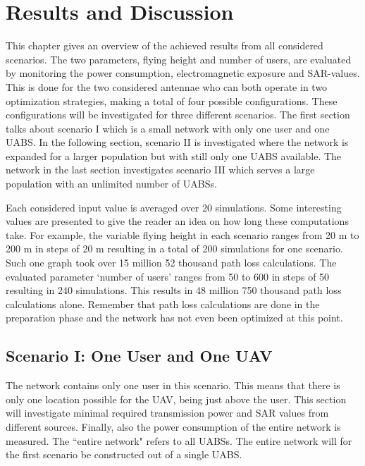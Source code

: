 \chapter{Results and Discussion}
\label{chap:results}

This chapter gives an overview of the achieved results from all considered scenarios. The two parameters,
flying height and number of users, are evaluated by monitoring the power consumption, electromagnetic exposure and \gls{SAR}-values.
This is done for the two considered antennae who can both operate in two optimization strategies, making a total of four possible configurations.
These configurations will be investigated for three different scenarios.
The first section talks about scenario I which is a small network with only one user and one \gls{UABS}. In 
the following section, scenario II is investigated where the network is expanded for a larger population 
but with still only one \gls{UABS} available.
The network in the last section investigates scenario III which serves a large population with an unlimited number of \gls{UABS}s.

Each considered input value is averaged over 20 simulations. 
Some interesting values are presented to give the reader an idea on how long these computations take.
For example, the variable flying height in each scenario ranges from 
20 m to 200 m in steps of 20 m resulting in a total of 200 simulations for one scenario. 
Such one graph took over 15 million 52 thousand path loss calculations.
The evaluated parameter  `number of users'
ranges from 50 to 600 in steps of 50 resulting 
in 240 simulations. This results in 48 million 750 thousand path loss calculations alone. Remember that path loss calculations
are done in the preparation phase and the network has not even been optimized at this point.

\section{Scenario I: One User and One \gls{UAV}}
The network contains only one user in this scenario. This means that there is only one location possible for the \gls{UAV},
being just above 
the user. This section will investigate minimal required transmission power and SAR values from different sources.
Finally, also the power consumption of the entire network is measured. The  ``entire network" refers to all \gls{UABS}s. The entire network 
will for the first scenario be constructed out of a single \gls{UABS}.


